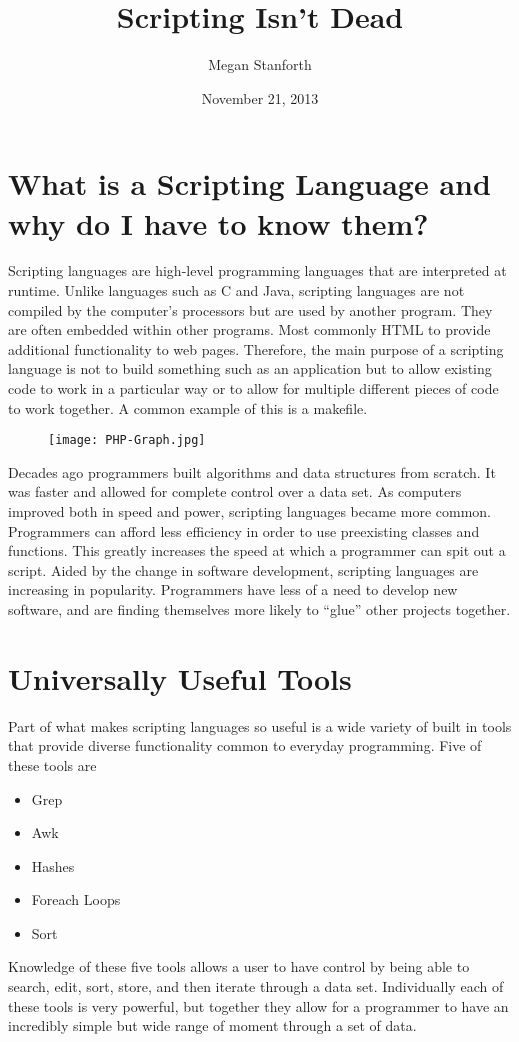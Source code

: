\documentclass[11pt]{paper}
\begin{document}
\title{Scripting Isn't Dead}
\date{November 21, 2013}
\author{Megan Stanforth}
\maketitle
\section{What is a Scripting Language and why do I have to know them?}

\indent 
Scripting languages are high-level programming languages that are interpreted at runtime. Unlike languages such as C and Java, scripting languages are not compiled by the computer’s processors but are used by another program. They are often embedded within other programs. Most commonly HTML to provide additional functionality to web pages. Therefore, the main purpose of a scripting language is not to build something such as an application but to allow existing code to work in a particular way or to allow for multiple different pieces of code to work together. A common example of this is a makefile. 


\begin{figure}
    \centering
    \texttt{[image: PHP-Graph.jpg]}
\end{figure}


\indent
Decades ago programmers built algorithms and data structures from scratch. It was faster and allowed for complete control over a data set. As computers improved both in speed and power, scripting languages became more common. Programmers can afford less efficiency in order to use preexisting classes and functions. This greatly increases the speed at which a programmer can spit out a script. Aided by the change in software development, scripting languages are increasing in popularity. Programmers have less of a need to develop new software, and are finding themselves more likely to ``glue'' other projects together. 


\section{Universally Useful Tools}

Part of what makes scripting languages so useful is a wide variety of built in tools that provide diverse functionality common to everyday programming. Five of these tools are
\begin{itemize}
	\item Grep
	\item Awk
	\item Hashes
	\item Foreach Loops
	\item Sort
\end{itemize}
\indent
Knowledge of these five tools allows a user to have control by being able to search, edit, sort, store, and then iterate through a data set. Individually each of these tools is very powerful, but together they allow for a programmer to have an incredibly simple but wide range of moment through a set of data.
\end{document}
